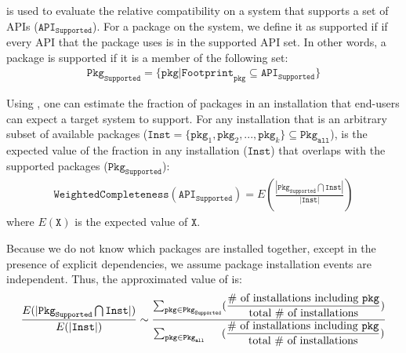 \vspace{0.1in}
{\noindent
{}}
\vspace{0.1in}

\Compatmetric{} is used to evaluate the relative compatibility on a system that
supports a set of APIs ($\mathtt{API}_\mathtt{Supported}$).
For a package on the system, we define it as supported if 
if every API that the package uses is in the supported API set.
In other words, a package is supported if it is a member of the following set:
\begin{align*}
\mathtt{Pkg}_\mathtt{Supported} = \{\mathtt{pkg} | \mathtt{Footprint}_\mathtt{pkg} \subseteq \mathtt{API}_\mathtt{Supported}\}
\end{align*}

\noindent
Using \compatmetric{}, one can estimate the fraction of packages in an installation that end-users can expect a target system to support.
For any installation
that is an arbitrary subset of available packages
($\mathtt{Inst} = \{\mathtt{pkg}_1, \mathtt{pkg}_2, ..., \mathtt{pkg}_k\} \subseteq \mathtt{Pkg}_\mathtt{all}$),
\compatmetric{} is the expected value of
the fraction in any installation ($\mathtt{Inst}$)
that overlaps with the supported packages ($\mathtt{Pkg}_\mathtt{Supported}$):
\begin{align*}
\mathtt{Weighted Completeness}(\mathtt{API}_\mathtt{Supported}) =
E(\frac{|\mathtt{Pkg}_\mathtt{Supported} \bigcap \mathtt{Inst}|}{|\mathtt{Inst}|}) 
\end{align*}
where $E(\mathtt{X})$ is the expected value of $\mathtt{X}$.

Because we do not know which packages are installed together,
except in the presence of explicit dependencies,
we assume package installation events are independent.
Thus, the approximated value of \compatmetric{} is:
\begin{align*}
\frac{E(|\mathtt{Pkg}_\mathtt{Supported} \bigcap \mathtt{Inst}|)}{E(|\mathtt{Inst}|)}
\sim \dfrac{\sum_{\mathtt{pkg} \in \mathtt{Pkg}_\mathtt{Supported}} (\dfrac{\text{\# of installations including $\mathtt{pkg}$}}{\text{total \# of installations}})}{\sum_{\mathtt{pkg} \in \mathtt{Pkg}_\mathtt{all\hspace{0.21in}}} (\dfrac{\text{\# of installations including $\mathtt{pkg}$}}{\text{total \# of installations}})}
\end{align*}
